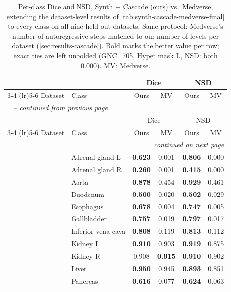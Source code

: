 \documentclass[hidelinks, a4paper, 12pt, ngerman, english]{article}  %
\begin{document}
\begin{longtable}{@{}llcccc@{}}
  \caption{Per-class Dice and NSD, Synth + Cascade (ours) vs.\ Medverse,
  extending the dataset-level results of
  \autoref{tab:synth-cascade-medverse-final} to every class on all nine
  held-out datasets. Same protocol: Medverse's number of autoregressive steps
  matched to our number of levels per dataset
  (\autoref{sec:results-cascade}). Bold marks the better value per row; exact
  ties are left unbolded (GNC\_705, Hyper mask L, NSD: both 0.000). MV:
  Medverse.}
  \label{tab:synth-cascade-medverse-perclass} \\
  \toprule
  & & \multicolumn{2}{c}{Dice} & \multicolumn{2}{c}{NSD} \\
  \cmidrule(lr){3-4} \cmidrule(lr){5-6}
  Dataset & Class & Ours & MV & Ours & MV \\
  \midrule
  \endfirsthead
  \multicolumn{6}{l}{\textit{\tablename\ \thetable{} -- continued from previous page}} \\
  \toprule
  & & \multicolumn{2}{c}{Dice} & \multicolumn{2}{c}{NSD} \\
  \cmidrule(lr){3-4} \cmidrule(lr){5-6}
  Dataset & Class & Ours & MV & Ours & MV \\
  \midrule
  \endhead
  \midrule
  \multicolumn{6}{r}{\textit{continued on next page}} \\
  \endfoot
  \bottomrule
  \endlastfoot
  \multirow{13}{*}{FLARE22} & Adrenal gland L & \textbf{0.623} & 0.001 & \textbf{0.806} & 0.000 \\
   & Adrenal gland R & \textbf{0.260} & 0.001 & \textbf{0.415} & 0.000 \\
   & Aorta & \textbf{0.878} & 0.454 & \textbf{0.929} & 0.461 \\
   & Duodenum & \textbf{0.500} & 0.020 & \textbf{0.502} & 0.029 \\
   & Esophagus & \textbf{0.678} & 0.004 & \textbf{0.747} & 0.005 \\
   & Gallbladder & \textbf{0.757} & 0.019 & \textbf{0.797} & 0.017 \\
   & Inferior vena cava & \textbf{0.808} & 0.119 & \textbf{0.813} & 0.112 \\
   & Kidney L & \textbf{0.910} & 0.903 & \textbf{0.919} & 0.875 \\
   & Kidney R & 0.908 & \textbf{0.915} & \textbf{0.910} & 0.902 \\
   & Liver & \textbf{0.950} & 0.945 & \textbf{0.893} & 0.851 \\
   & Pancreas & \textbf{0.616} & 0.077 & \textbf{0.624} & 0.063 \\

\end{longtable}
\end{document}
